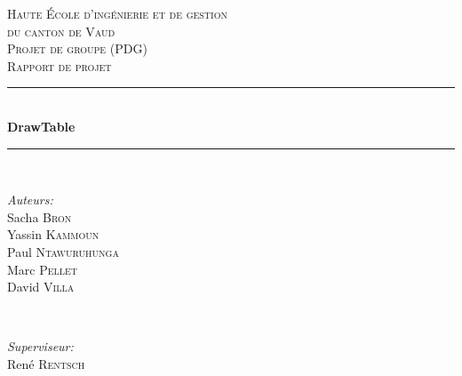 \documentclass[11pt,a4paper,oldfontcommands]{memoir}
\begin{document}
\begin{titlepage}

\newcommand{\HRule}{\rule{\linewidth}{0.5mm}}

\center
 

\textsc{\LARGE Haute École d'ingénierie et de gestion \\du canton de Vaud}\\[1.5cm]
\textsc{\Large Projet de groupe (PDG)}\\[0.5cm]
\textsc{\large Rapport de projet}\\[0.5cm]


\HRule \\[0.8cm]
{ \huge \bfseries DrawTable}\\[0.4cm]
\HRule \\[1.5cm]
 

\begin{minipage}{0.4\textwidth}
\begin{flushleft} \large
\emph{Auteurs:}\\
Sacha \textsc{Bron}\\
Yassin \textsc{Kammoun}\\
Paul \textsc{Ntawuruhunga}\\
Marc \textsc{Pellet}\\
David \textsc{Villa}
\end{flushleft}
\end{minipage}
~
\begin{minipage}{0.4\textwidth}
\begin{flushright} \large
\emph{Superviseur:} \\
René \textsc{Rentsch} 
\break 
\break 
\break 
\break 
\end{flushright}
\end{minipage}\\[4cm]


\end{titlepage}
\end{document}

